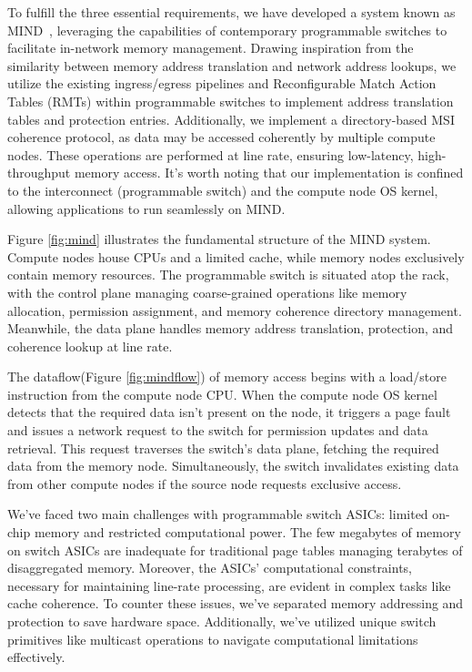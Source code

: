 To fulfill the three essential requirements, we have developed a system known as MIND~\cite{mind}, leveraging the capabilities of contemporary programmable switches to facilitate in-network memory management. Drawing inspiration from the similarity between memory address translation and network address lookups, we utilize the existing ingress/egress pipelines and Reconfigurable Match Action Tables (RMTs)\cite{rmt} within programmable switches to implement address translation tables and protection entries. Additionally, we implement a directory-based MSI coherence protocol\cite{msi}, as data may be accessed coherently by multiple compute nodes. These operations are performed at line rate, ensuring low-latency, high-throughput memory access. It's worth noting that our implementation is confined to the interconnect (programmable switch) and the compute node OS kernel, allowing applications to run seamlessly on MIND.

Figure \ref{fig:mind} illustrates the fundamental structure of the MIND system. Compute nodes house CPUs and a limited cache, while memory nodes exclusively contain memory resources. The programmable switch is situated atop the rack, with the control plane managing coarse-grained operations like memory allocation, permission assignment, and memory coherence directory management. Meanwhile, the data plane handles memory address translation, protection, and coherence lookup at line rate.

The dataflow(Figure \ref{fig:mindflow}) of memory access begins with a load/store instruction from the compute node CPU. When the compute node OS kernel detects that the required data isn't present on the node, it triggers a page fault and issues a network request to the switch for permission updates and data retrieval. This request traverses the switch's data plane, fetching the required data from the memory node. Simultaneously, the switch invalidates existing data from other compute nodes if the source node requests exclusive access.

We've faced two main challenges with programmable switch ASICs: limited on-chip memory and restricted computational power. The few megabytes of memory on switch ASICs are inadequate for traditional page tables managing terabytes of disaggregated memory. Moreover, the ASICs' computational constraints, necessary for maintaining line-rate processing, are evident in complex tasks like cache coherence. To counter these issues, we've separated memory addressing and protection to save hardware space. Additionally, we've utilized unique switch primitives like multicast operations to navigate computational limitations effectively.

